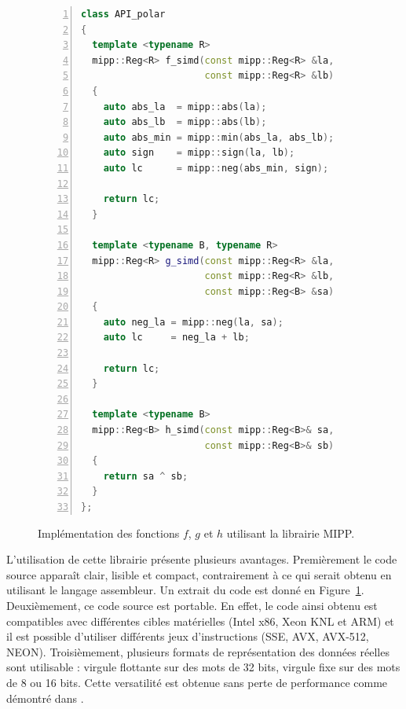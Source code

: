   \begin{figure}[t]
  \begin{lstlisting}[language=C++, numbers=left, numbersep=0.3em, tabsize=2, basicstyle=\footnotesize\ttfamily]
class API_polar
{
  template <typename R>
  mipp::Reg<R> f_simd(const mipp::Reg<R> &la,
                      const mipp::Reg<R> &lb)
  {
    auto abs_la  = mipp::abs(la);
    auto abs_lb  = mipp::abs(lb);
    auto abs_min = mipp::min(abs_la, abs_lb);
    auto sign    = mipp::sign(la, lb);
    auto lc      = mipp::neg(abs_min, sign);

    return lc;
  }

  template <typename B, typename R>
  mipp::Reg<R> g_simd(const mipp::Reg<R> &la,
                      const mipp::Reg<R> &lb,
                      const mipp::Reg<B> &sa)
  {
    auto neg_la = mipp::neg(la, sa);
    auto lc     = neg_la + lb;

    return lc;
  }

  template <typename B>
  mipp::Reg<B> h_simd(const mipp::Reg<B>& sa,
                      const mipp::Reg<B>& sb)
  {
    return sa ^ sb;
  }
};
  \end{lstlisting}
  \caption{Implémentation des fonctions $f$, $g$ et $h$ utilisant la librairie MIPP.}
  \label{fig:mipp}
  \end{figure}
L'utilisation de cette librairie présente plusieurs avantages. Premièrement le code source apparaît clair, lisible et compact, contrairement à ce qui serait obtenu en utilisant le langage assembleur. Un extrait du code est donné en Figure~\ref{fig:mipp}. Deuxièmement, ce code source est portable. En effet, le code ainsi obtenu est compatibles avec différentes cibles matérielles (Intel x86, Xeon KNL et ARM) et il est possible d'utiliser différents jeux d'instructions (SSE, AVX, AVX-512, NEON). Troisièmement, plusieurs formats de représentation des données réelles sont utilisable : virgule flottante sur des mots de 32 bits, virgule fixe sur des mots de 8 ou 16 bits. Cette versatilité est obtenue sans perte de performance comme démontré dans \cite{cassagne2018mipp}.

